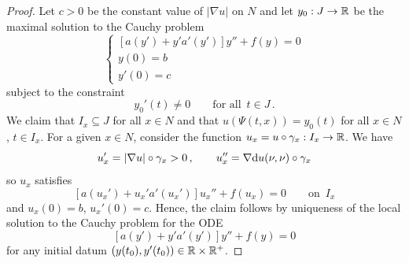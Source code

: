 \documentclass[10 pt,a4paper]{article}
\theoremstyle{definition}
\begin{document}
\begin{proof}
	Let $c>0$ be the constant value of $|\nabla u|$ on $N$ and let $y_0 : J \to \mathbb R$ be the maximal solution to the Cauchy problem
	\[
	\begin{cases}
		[a(y')+y'a'(y')] y'' + f(y) = 0 \\
		y(0) = b \\
		y'(0) = c
	\end{cases}
	\]
	subject to the constraint
	\[
		y_0'(t) \neq 0 \qquad \text{for all } \, t \in J \, .
	\]
	We claim that $I_x \subseteq J$ for all $x\in N$ and that $u(\Psi(t,x)) = y_0(t)$ for all $x\in N$, $t\in I_x$. For a given $x\in N$, consider the function $u_x = u\circ\gamma_x : I_x \to \mathbb R$. We have
	\[
		u_x' = |\nabla u|\circ\gamma_x > 0 \, , \qquad u_x'' = \nabla\mathrm{d} u(\nu,\nu) \circ \gamma_x
	\]
	so $u_x$ satisfies
	\[
		[a(u_x') + u_x' a'(u_x')] u_x'' + f(u_x) = 0 \qquad \text{on } \, I_x
	\]
	and $u_x(0) = b$, $u_x'(0) = c$. Hence, the claim follows by uniqueness of the local solution to the Cauchy problem for the ODE
	\[
		[a(y')+y'a'(y')]y'' + f(y) = 0
	\]
	for any initial datum $(y(t_0),y'(t_0)) \in \mathbb R\times\mathbb R^+$.
	

\end{proof}
\end{document}
